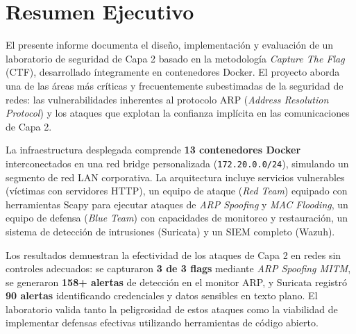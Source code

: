 \documentclass[12pt, a4paper]{article}
\begin{document}
\newpage
\thispagestyle{empty}
\mbox{}
\newpage

\tableofcontents
\newpage
\listoffigures
\newpage
\listoftables
\newpage

\setcounter{page}{1}

\section{Resumen Ejecutivo}

El presente informe documenta el dise\~no, implementaci\'on y evaluaci\'on de un laboratorio de seguridad de Capa 2 basado en la metodolog\'ia \textit{Capture The Flag} (CTF), desarrollado \'integramente en contenedores Docker. El proyecto aborda una de las \'areas m\'as cr\'iticas y frecuentemente subestimadas de la seguridad de redes: las vulnerabilidades inherentes al protocolo ARP (\textit{Address Resolution Protocol}) y los ataques que explotan la confianza impl\'icita en las comunicaciones de Capa 2.

La infraestructura desplegada comprende \textbf{13 contenedores Docker} interconectados en una red bridge personalizada (\texttt{172.20.0.0/24}), simulando un segmento de red LAN corporativa. La arquitectura incluye servicios vulnerables (v\'ictimas con servidores HTTP), un equipo de ataque (\textit{Red Team}) equipado con herramientas Scapy para ejecutar ataques de \textit{ARP Spoofing} y \textit{MAC Flooding}, un equipo de defensa (\textit{Blue Team}) con capacidades de monitoreo y restauraci\'on, un sistema de detecci\'on de intrusiones (Suricata) y un SIEM completo (Wazuh).

Los resultados demuestran la efectividad de los ataques de Capa 2 en redes sin controles adecuados: se capturaron \textbf{3 de 3 flags} mediante \textit{ARP Spoofing MITM}, se generaron \textbf{158+ alertas} de detecci\'on en el monitor ARP, y Suricata registr\'o \textbf{90 alertas} identificando credenciales y datos sensibles en texto plano. El laboratorio valida tanto la peligrosidad de estos ataques como la viabilidad de implementar defensas efectivas utilizando herramientas de c\'odigo abierto.
\end{document}
